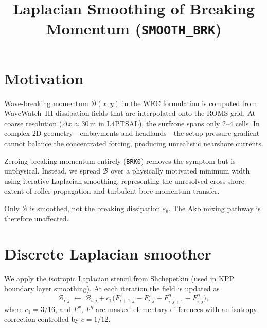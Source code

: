 \documentclass[11pt]{article}
\title{Laplacian Smoothing of Breaking Momentum (\texttt{SMOOTH\_BRK})}
\author{}
\date{}
\begin{document}
\maketitle

\section{Motivation}

Wave-breaking momentum $\mathcal{B}(x,y)$ in the WEC formulation is computed from
WaveWatch~III dissipation fields that are interpolated onto the ROMS grid. At coarse
resolution ($\Delta x \approx 30$\,m in L4PTSAL), the surfzone spans only 2--4 cells.
In complex 2D geometry---embayments and headlands---the setup pressure gradient cannot
balance the concentrated forcing, producing unrealistic nearshore currents.

Zeroing breaking momentum entirely (\texttt{BRK0}) removes the symptom but is
unphysical. Instead, we spread $\mathcal{B}$ over a physically motivated minimum
width using iterative Laplacian smoothing, representing the unresolved cross-shore
extent of roller propagation and turbulent bore momentum transfer.

Only $\mathcal{B}$ is smoothed, not the breaking dissipation $\varepsilon_b$.
The Akb mixing pathway is therefore unaffected.

\section{Discrete Laplacian smoother}

We apply the isotropic Laplacian stencil from Shchepetkin (used in KPP boundary
layer smoothing). At each iteration the field is updated as
\begin{equation}
  \mathcal{B}_{i,j} \;\leftarrow\; \mathcal{B}_{i,j}
  + c_1\bigl(F^x_{i+1,j} - F^x_{i,j} + F^\eta_{i,j+1} - F^\eta_{i,j}\bigr),
  \label{eq:update}
\end{equation}
where $c_1 = 3/16$, and $F^x$, $F^\eta$ are masked elementary differences with
an isotropy correction controlled by $c = 1/12$.
\end{document}
